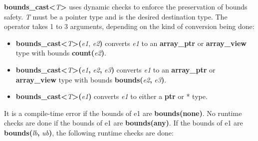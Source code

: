 \documentclass[]{article}
\begin{document}
\textbf{bounds\_cast\textless{}}\emph{T}\textbf{\textgreater{}} uses
dynamic checks to enforce the preservation of bounds safety. \emph{T}
must be a pointer type and is the desired destination type. The operator
takes 1 to 3 arguments, depending on the kind of conversion being done:

\begin{itemize}
\item
  \textbf{bounds\_cast\textless{}}\emph{T}\textbf{\textgreater{}(}\emph{e1},
  \emph{e2}\textbf{)} converts \emph{e1} to an \textbf{array\_ptr} or
  \textbf{array\_view} type with bounds
  \textbf{count(}\emph{e2}\textbf{)}.
\item
  \textbf{bounds\_cast\textless{}}\emph{T}\textbf{\textgreater{}(}\emph{e1}\textbf{,}
  \emph{e2}\textbf{,} \emph{e3}\textbf{)} converts \emph{e1} to an
  \textbf{array\_ptr} or \textbf{array\_view} type with bounds
  \textbf{bounds(}\emph{e2}\textbf{,} \emph{e3}\textbf{)}.
\item
  \textbf{bounds\_cast\textless{}}\emph{T}\textbf{\textgreater{}(}\emph{e1}\textbf{)}
  converts \emph{e1} to either a \textbf{ptr} or * type.
\end{itemize}

It is a compile-time error if the bounds of e1 are
\textbf{bounds(none)}. No runtime checks are done if the bounds of e1
are \textbf{bounds(any)}. If the bounds of e1 are
\textbf{bounds(}\emph{lb}\textbf{,} \emph{ub}\textbf{)}, the following
runtime checks are done:
\end{document}
